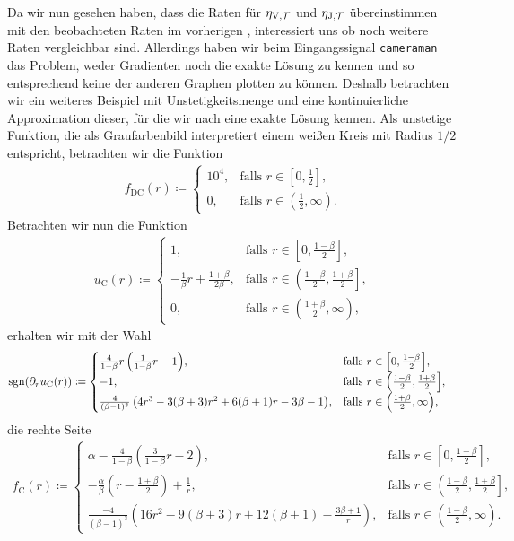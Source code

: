 Da wir nun gesehen haben, dass die Raten für $\eta_{\textup{V}, \mathcal{T}}$ und $\eta_{\textup{J}, \mathcal{T}}$ übereinstimmen
mit den beobachteten Raten im vorherigen
, interessiert uns ob noch weitere
Raten vergleichbar sind. 
Allerdings haben wir beim Eingangssignal \texttt{cameraman} das Problem,
weder Gradienten noch die exakte Lösung zu kennen und so entsprechend keine
der anderen Graphen plotten zu können.
Deshalb betrachten wir ein weiteres Beispiel mit Unstetigkeitsmenge und 
eine kontinuierliche Approximation dieser, für die wir nach
 eine exakte Lösung kennen.
Als unstetige Funktion, die als Graufarbenbild interpretiert einem 
weißen Kreis mit Radius $1/2$ entspricht, betrachten wir die Funktion
\begin{align*}
  f_\textrm{DC}(r)\coloneqq 
  \begin{cases}
    10^4, 
    & \text{falls } r\in \left[0,\frac{1}{2}\right]\!,\\
    0, 
    & \text{falls } r\in \left(\frac{1}{2},\infty\right)\!.
  \end{cases}
\end{align*}
Betrachten wir nun die Funktion
\begin{align*}
  u_\textrm{C}(r)\coloneqq 
  \begin{cases}
    1, 
    & \text{falls } r\in \left[0,\frac{1-\beta}{2}\right]\!,\\
    -\frac{1}{\beta}r + \frac{1+\beta}{2\beta}, 
    & \text{falls } r\in \left(\frac{1-\beta}{2}, \frac{1+\beta}{2}\right]\!,\\
    0,
    & \text{falls } r\in \left(\frac{1+\beta}{2},\infty\right)\!,
  \end{cases}
\end{align*}
erhalten wir mit der Wahl
\begin{align*}
  \operatorname{sgn}(\partial_r u_\textrm{C}(r)) 
  &\coloneqq 
  \begin{cases}
    \frac{4}{1-\beta}r\left(\frac{1}{1-\beta}r -1\right)\!, 
    & \text{falls } r\in \left[0,\frac{1-\beta}{2}\right]\!,\\
    -1,
    & \text{falls } r\in \left(\frac{1-\beta}{2}, \frac{1+\beta}{2}\right]\!,\\
    \frac{4}{(\beta-1)^3}
    \left( 4r^3-3(\beta+3)r^2 +6(\beta+1)r-3\beta-1\right)\!, 
    & \text{falls } r\in \left(\frac{1+\beta}{2},\infty\right)\!,
  \end{cases}
\end{align*}
die rechte Seite
\begin{align*}
  f_\textrm{C}(r)\coloneqq 
  \begin{cases}
    \alpha - \frac{4}{1-\beta}\left(\frac{3}{1-\beta}r - 2\right)\!, 
    & \text{falls } r\in \left[0,\frac{1-\beta}{2}\right]\!,\\
    -\frac{\alpha}{\beta}\left( r-\frac{1+\beta}{2} \right) +\frac{1}{r}, 
    & \text{falls } r\in \left(\frac{1-\beta}{2}, \frac{1+\beta}{2}\right]\!,\\
    \frac{-4}{(\beta-1)^3}
    \left( 16r^2 -9(\beta+3)r + 12(\beta+1) - \frac{3\beta+1}{r}\right)\!, 
    & \text{falls } r\in \left(\frac{1+\beta}{2},\infty\right)\!.
  \end{cases}
\end{align*}
